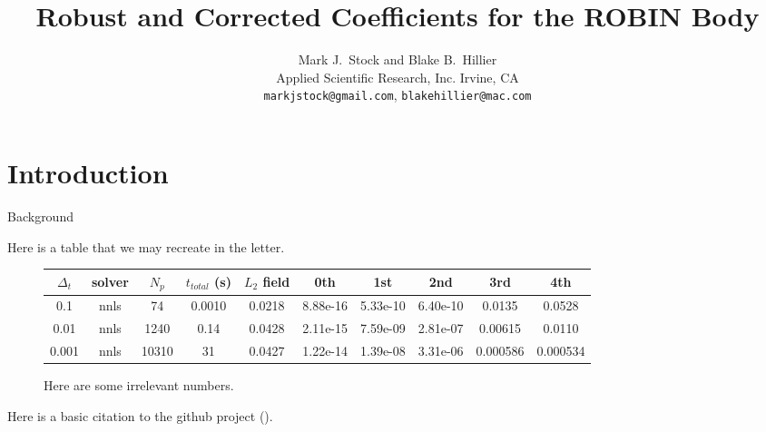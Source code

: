 \documentclass[12pt]{article}
\title{Robust and Corrected Coefficients for the ROBIN Body}
\author{Mark J.~Stock and Blake B.~Hillier\\
        Applied Scientific Research, Inc.
        Irvine, CA\\
        \texttt{markjstock@gmail.com}, \texttt{blakehillier@mac.com}
}
\begin{document}
\maketitle



\section{Introduction}
Background

Here is a table that we may recreate in the letter.

\begin{figure} \begin{centering}
\begin{small}
\begin{tabular}{cccccccccc}
$\Delta_t$ & solver & $N_p$ & $t_{total}$ (s) & $L_2$ field & 0th & 1st & 2nd & 3rd & 4th \\
\hline
0.1 & nnls & 74 & 0.0010 & 0.0218 & 8.88e-16 & 5.33e-10 & 6.40e-10 & 0.0135 & 0.0528 \\
\hline
0.01 & nnls & 1240 & 0.14 & 0.0428 & 2.11e-15 & 7.59e-09 & 2.81e-07 & 0.00615 & 0.0110 \\
\hline
0.001 & nnls & 10310 & 31 & 0.0427 & 1.22e-14 & 1.39e-08 & 3.31e-06 & 0.000586 & 0.000534 \\
\end{tabular}
\caption{Here are some irrelevant numbers. }
\label{solverres}
\end{small}
\end{centering}\end{figure}%

Here is a basic citation to the github project (\cite{robinsurfmesh}).
\end{document}
